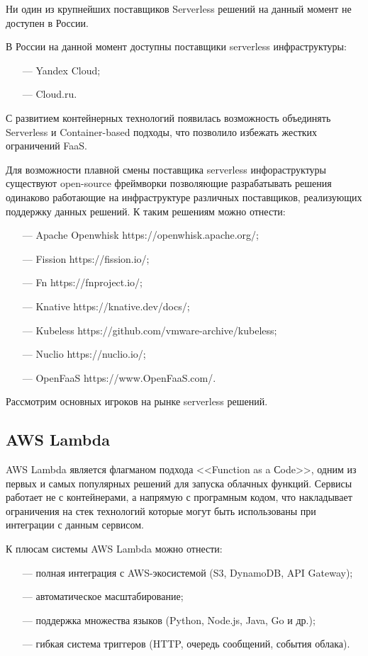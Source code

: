 Ни один из крупнейших поставщиков Serverless решений на данный момент не доступен в России.

В России на данной момент доступны поставщики serverless инфраструктуры:
\begin{itemize}
    \item[---] Yandex Cloud;
    \item[---] Cloud.ru.
\end{itemize}

С развитием контейнерных технологий появилась возможность объединять Serverless и Container-based подходы, что позволило избежать жестких ограничений FaaS.

Для возможности плавной смены поставщика serverless инфораструктуры существуют open-source фреймворки позволяющие разрабатывать решения одинаково работающие на инфраструктуре различных поставщиков, реализующих поддержку данных решений. К таким решениям можно отнести:
\begin{itemize}
    \item[---]Apache Openwhisk https://openwhisk.apache.org/;
    \item[---]Fission https://fission.io/;
    \item[---]Fn https://fnproject.io/;
    \item[---]Knative https://knative.dev/docs/;
    \item[---]Kubeless https://github.com/vmware-archive/kubeless;
    \item[---]Nuclio https://nuclio.io/;
    \item[---]OpenFaaS https://www.OpenFaaS.com/.
\end{itemize}

Рассмотрим основных игроков на рынке serverless решений.

\subsection{AWS Lambda}

AWS Lambda является флагманом подхода <<Function as a Сode>>, одним из первых и самых популярных решений для запуска облачных функций. Сервисы работает не с контейнерами, а напрямую с програмным кодом, что накладывает ограничения на стек технологий которые могут быть использованы при интеграции с данным сервисом.

К плюсам системы AWS Lambda можно отнести:
\begin{itemize}
    \item[---]полная интеграция с AWS-экосистемой (S3, DynamoDB, API Gateway);
    \item[---]автоматическое масштабирование;
    \item[---]поддержка множества языков (Python, Node.js, Java, Go и др.);
    \item[---]гибкая система триггеров (HTTP, очередь сообщений, события облака).
\end{itemize}

